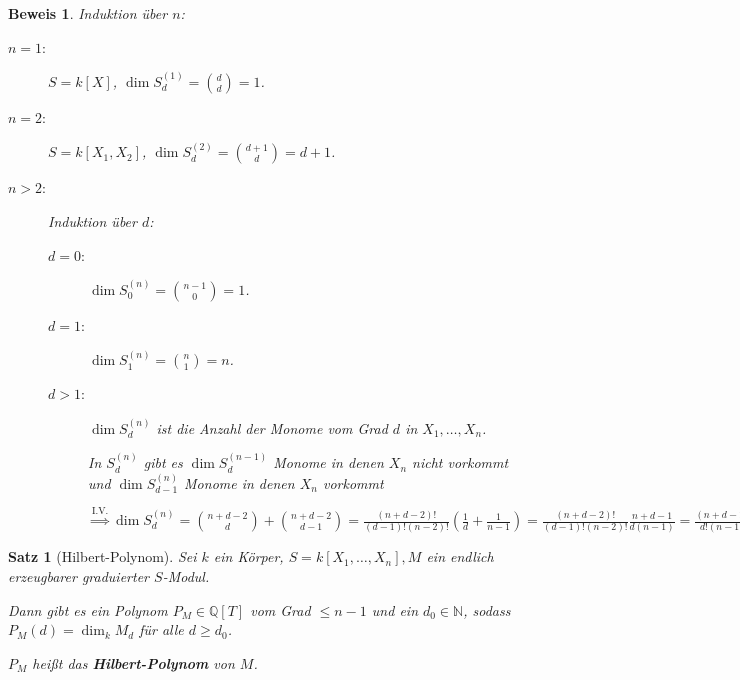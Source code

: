 \documentclass[a4paper,12pt]{scrbook}
\theoremstyle{break}
\newtheorem{Satz}{Satz}
\theoremstyle{nonumberbreak}
\newtheorem{Bew}{Beweis}
\theoremstyle{nonumberplain}
\newcommand{\emp}[1]{\textbf{\emph{#1}}}
\begin{document}
\begin{Bew}
  Induktion über $n$:
  \begin{description}
    \item[$n=1$:] $S = k[X]$, $\dim S_d^{(1)} = {d \choose d} = 1$. \checkmark
    \item[$n=2$:] $S = k[X_1,X_2]$, $\dim S_d^{(2)} = {d+1 \choose d} = d+1$. \checkmark
    \item [$n>2$:] Induktion über $d$:
      \begin{description}
        \item[$d=0$:] $\dim S_0^{(n)} = {n-1 \choose 0} = 1$. \checkmark
        \item[$d=1$:] $\dim S_1^{(n)} = {n \choose 1} = n$. \checkmark
        \item[$d>1$:] $\dim S_d^{(n)}$ ist die Anzahl der Monome vom Grad $d$ in $X_1, \dots, X_n$.
          
          In $S_d^{(n)}$ gibt es $\dim S_d^{(n-1)}$ Monome in denen $X_n$ nicht
          vorkommt und $\dim S_{d-1}^{(n)}$ Monome in denen $X_n$ vorkommt

          $\overset{\text{I.V.}}{\Longrightarrow} \dim S_d^{(n)} = {n+d-2 \choose d} + {n+d-2
            \choose d-1} = \frac{(n+d-2)!}{(d-1)! (n-2)!} (\frac{1}{d} + \frac{1}{n-1}) =
          \frac{(n+d-2)!}{(d-1)! (n-2)!} \frac{n+d-1}{d(n-1)} = \frac{(n+d-1)!}{d!
            (n-1)!} = {n+d-1 \choose d}$
        \end{description}
      \end{description}
\end{Bew}

\begin{Satz}[Hilbert-Polynom]
\label{Satz6}
  Sei $k$ ein Körper, $S=k[X_1, \dots, X_n], M$ ein endlich erzeugbarer
  graduierter $S$-Modul.

  Dann gibt es ein Polynom $P_M \in \mathbb{Q}[T]$ vom Grad $\le n -1 $ und ein
  $d_0 \in \mathbb{N}$, sodass $P_M(d) = \dim_k M_d$ für alle $d \ge d_0$.

  $P_M$ heißt das \emp{Hilbert-Polynom} von $M$.
\end{Satz}
\end{document}
